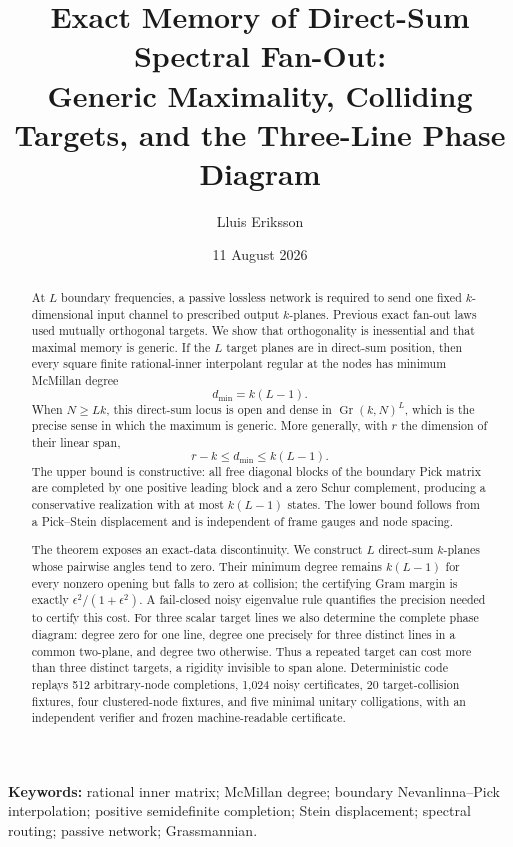 \documentclass[11pt]{article}
\title{Exact Memory of Direct-Sum Spectral Fan-Out:\\
Generic Maximality, Colliding Targets, and the Three-Line Phase Diagram}
\author{Lluis Eriksson}
\date{11 August 2026}
\theoremstyle{definition}
\theoremstyle{remark}
\begin{document}
\maketitle

\begin{abstract}
At $L$ boundary frequencies, a passive lossless network is required to send
one fixed $k$-dimensional input channel to prescribed output $k$-planes.
Previous exact fan-out laws used mutually orthogonal targets.  We show that
orthogonality is inessential and that maximal memory is generic.  If the
$L$ target planes are in direct-sum position, then every square finite
rational-inner interpolant regular at the nodes has minimum McMillan degree
\[
                         d_{\min}=k(L-1).
\]
When $N\ge Lk$, this direct-sum locus is open and dense in
$\operatorname{Gr}(k,N)^L$, which is the precise sense in which the maximum
is generic.
More generally, with $r$ the dimension of their linear span,
\[
                         r-k\le d_{\min}\le k(L-1).
\]
The upper bound is constructive: all free diagonal blocks of the boundary
Pick matrix are completed by one positive leading block and a zero Schur
complement, producing a conservative realization with at most $k(L-1)$
states.  The lower bound follows from a Pick--Stein displacement and is
independent of frame gauges and node spacing.

The theorem exposes an exact-data discontinuity.  We construct $L$ direct-sum
$k$-planes whose pairwise angles tend to zero.  Their minimum degree remains
$k(L-1)$ for every nonzero opening but falls to zero at collision; the
certifying Gram margin is exactly $\epsilon^2/(1+\epsilon^2)$.  A fail-closed
noisy eigenvalue rule quantifies the precision needed to certify this cost.
For three scalar target lines we also determine the complete phase diagram:
degree zero for one line, degree one precisely for three distinct lines in a
common two-plane, and degree two otherwise.  Thus a repeated target can cost
more than three distinct targets, a rigidity invisible to span alone.
Deterministic code replays 512 arbitrary-node completions, 1,024 noisy
certificates, 20 target-collision fixtures, four clustered-node fixtures, and
five minimal unitary colligations, with an independent verifier and frozen
machine-readable certificate.
\end{abstract}

\noindent\textbf{Keywords:} rational inner matrix; McMillan degree;
boundary Nevanlinna--Pick interpolation; positive semidefinite completion;
Stein displacement; spectral routing; passive network; Grassmannian.
\end{document}

